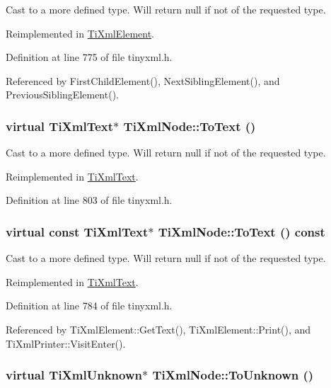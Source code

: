 Cast to a more defined type. Will return null if not of the requested type. 

Reimplemented in \hyperlink{class_ti_xml_element_ac5b8d0e25fa23fd9acbb6d146082901c}{TiXmlElement}.

Definition at line 775 of file tinyxml.h.

Referenced by FirstChildElement(), NextSiblingElement(), and PreviousSiblingElement().\hypertarget{class_ti_xml_node_a3ddfbcac78fbea041fad57e5c6d60a03}{
\subsubsection[{ToText}]{\setlength{\rightskip}{0pt plus 5cm}virtual {\bf TiXmlText}$\ast$ TiXmlNode::ToText ()}}
\label{class_ti_xml_node_a3ddfbcac78fbea041fad57e5c6d60a03}


Cast to a more defined type. Will return null if not of the requested type. 

Reimplemented in \hyperlink{class_ti_xml_text_ae7c3a8fd3e4dbf6c0c4363a943d72f5b}{TiXmlText}.

Definition at line 803 of file tinyxml.h.\hypertarget{class_ti_xml_node_a95a46a52c525992d6b4ee08beb14cd69}{
\subsubsection[{ToText}]{\setlength{\rightskip}{0pt plus 5cm}virtual const {\bf TiXmlText}$\ast$ TiXmlNode::ToText () const}}
\label{class_ti_xml_node_a95a46a52c525992d6b4ee08beb14cd69}


Cast to a more defined type. Will return null if not of the requested type. 

Reimplemented in \hyperlink{class_ti_xml_text_a895bf34ffad17f7439ab2a52b9651648}{TiXmlText}.

Definition at line 784 of file tinyxml.h.

Referenced by TiXmlElement::GetText(), TiXmlElement::Print(), and TiXmlPrinter::VisitEnter().\hypertarget{class_ti_xml_node_a06de5af852668c7e4af0d09c205f0b0d}{
\subsubsection[{ToUnknown}]{\setlength{\rightskip}{0pt plus 5cm}virtual {\bf TiXmlUnknown}$\ast$ TiXmlNode::ToUnknown ()}}
\label{class_ti_xml_node_a06de5af852668c7e4af0d09c205f0b0d}


